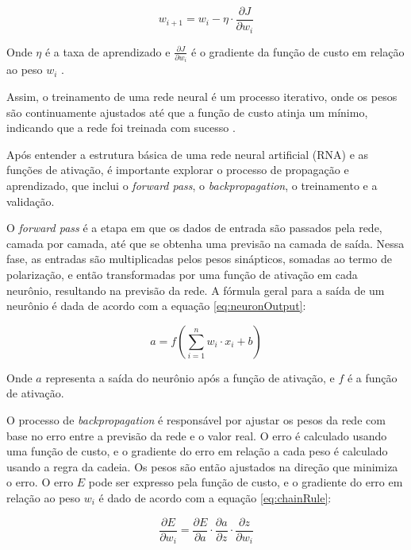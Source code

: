 \begin{equation}
    w_{i+1} = w_i - \eta \cdot \frac{\partial J}{\partial w_i}
    \label{eq:gradientDescent}
\end{equation}

Onde $\eta$ é a taxa de aprendizado e $\frac{\partial J}{\partial w_i}$ é o gradiente da função de custo em relação ao peso $w_i$ \cite{goodfellow2016deep}.

Assim, o treinamento de uma rede neural é um processo iterativo, onde os pesos são continuamente ajustados até que a função de custo atinja um mínimo, indicando que a rede foi treinada com sucesso \cite{lecun2015deep}.

Após entender a estrutura básica de uma rede neural artificial (RNA) e as funções de ativação, é importante explorar o processo de propagação e aprendizado, que inclui o \textit{forward pass}, o \textit{backpropagation}, o treinamento e a validação.

O \textit{forward pass} é a etapa em que os dados de entrada são passados pela rede, camada por camada, até que se obtenha uma previsão na camada de saída. Nessa fase, as entradas são multiplicadas pelos pesos sinápticos, somadas ao termo de polarização, e então transformadas por uma função de ativação em cada neurônio, resultando na previsão da rede. A fórmula geral para a saída de um neurônio é dada de acordo com a equação \eqref{eq:neuronOutput}:

\begin{equation}
    a = f\left(\sum_{i=1}^{n} w_i \cdot x_i + b\right)
    \label{eq:neuronOutput}
\end{equation}

Onde $a$ representa a saída do neurônio após a função de ativação, e $f$ é a função de ativação.

O processo de \textit{backpropagation} é responsável por ajustar os pesos da rede com base no erro entre a previsão da rede e o valor real. O erro é calculado usando uma função de custo, e o gradiente do erro em relação a cada peso é calculado usando a regra da cadeia. Os pesos são então ajustados na direção que minimiza o erro. O erro $E$ pode ser expresso pela função de custo, e o gradiente do erro em relação ao peso $w_i$ é dado de acordo com a equação \eqref{eq:chainRule}:

\begin{equation}
    \frac{\partial E}{\partial w_i} = \frac{\partial E}{\partial a} \cdot \frac{\partial a}{\partial z} \cdot \frac{\partial z}{\partial w_i}
    \label{eq:chainRule}
\end{equation}

